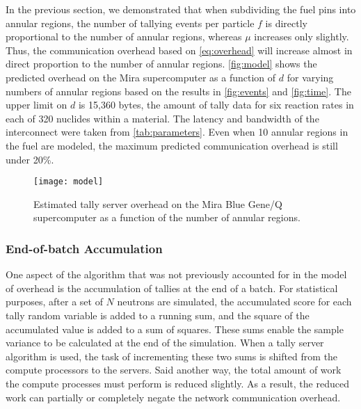 \documentclass{snamc2013}
\begin{document}
In the previous section, we demonstrated that when subdividing the fuel pins
into annular regions, the number of tallying events per particle $f$ is directly
proportional to the number of annular regions, whereas $\mu$ increases only
slightly. Thus, the communication overhead based on \eqref{eq:overhead} will
increase almost in direct proportion to the number of annular
regions. \autoref{fig:model} shows the predicted overhead on the Mira
supercomputer as a function of $d$ for varying numbers of annular regions based
on the results in \autoref{fig:events} and \autoref{fig:time}. The upper limit
on $d$ is 15,360 bytes, the amount of tally data for six reaction rates in each
of 320 nuclides within a material. The latency and bandwidth of the interconnect
were taken from \autoref{tab:parameters}. Even when 10 annular regions in the
fuel are modeled, the maximum predicted communication overhead is still under
20\%.
\begin{figure}[htb]
  \centering
  \texttt{[image: model]}
  \caption{Estimated tally server overhead on the Mira Blue Gene/Q supercomputer
    as a function of the number of annular regions.}
  \label{fig:model}
\end{figure}

\subsubsection{End-of-batch Accumulation}
\label{sec:end-of-batch}

One aspect of the algorithm that was not previously accounted for in the model
of overhead is the accumulation of tallies at the end of a batch. For
statistical purposes, after a set of $N$ neutrons are simulated, the accumulated
score for each tally random variable is added to a running sum, and the square
of the accumulated value is added to a sum of squares. These sums enable the
sample variance to be calculated at the end of the simulation. When a tally
server algorithm is used, the task of incrementing these two sums is shifted
from the compute processors to the servers. Said another way, the total amount
of work the compute processes must perform is reduced slightly. As a result, the
reduced work can partially or completely negate the network communication
overhead.
\end{document}
